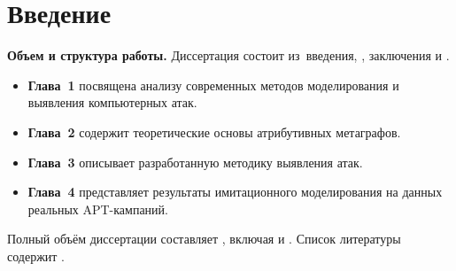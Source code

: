 
\chapter*{Введение}                         %

\newcommand{\actuality}{{\textbf\actualityTXT}}
\newcommand{\progress}{{\textbf\progressTXT}}
\newcommand{\aim}{{\textbf\aimTXT}}
\newcommand{\tasks}{\textbf{\tasksTXT}}
\newcommand{\novelty}{\textbf{\noveltyTXT}}
\newcommand{\influence}{\textbf{\influenceTXT}}
\newcommand{\methods}{\textbf{\methodsTXT}}
\newcommand{\defpositions}{\textbf{\defpositionsTXT}}
\newcommand{\reliability}{\textbf{\reliabilityTXT}}
\newcommand{\probation}{\textbf{\probationTXT}}
\newcommand{\contribution}{\textbf{\contributionTXT}}
\newcommand{\publications}{\textbf{\publicationsTXT}}


\textbf{Объем и структура работы.} Диссертация состоит из~введения,
,
заключения и
.
%

\begin{itemize}
    \item \textbf{Глава~1} посвящена анализу современных методов моделирования и выявления компьютерных атак.  
    \item \textbf{Глава~2} содержит теоретические основы атрибутивных метаграфов.  
    \item \textbf{Глава~3} описывает разработанную методику выявления атак.  
    \item \textbf{Глава~4} представляет результаты имитационного моделирования на данных реальных APT-кампаний.
\end{itemize}

Полный объём диссертации составляет
, включая
 и
.
Список литературы содержит
.

